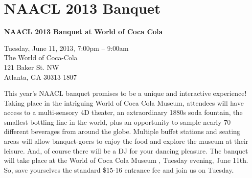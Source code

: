 \section{NAACL 2013 Banquet}
\begin{center}

\begin{Large}
{\bfseries\Large NAACL 2013 Banquet at World of Coca Cola}\vspace{1em}\par
\end{Large}

Tuesday, June 11, 2013, 7:00pm -- 9:00am \vspace{1em}\\
The World of Coca-Cola\\
121 Baker St. NW\\
Atlanta, GA 30313-1807\\
\end{center}

\noindent
This year's NAACL banquet promises to be a unique and interactive experience! Taking place in the intriguing World of Coca Cola Museum, attendees will have access to a multi-sensory 4D theater, an extraordinary 1880s soda fountain, the smallest bottling line in the world, plus an opportunity to sample nearly 70 different beverages from around the globe. Multiple buffet stations and seating areas will allow banquet-goers to enjoy the food and explore the museum at their leisure. And, of course there will be a DJ for your dancing pleasure. The banquet will take place at the World of Coca Cola Museum , Tuesday evening, June 11th. So, save yourselves the standard \$15-16 entrance fee and join us on Tuesday.


\newpage
